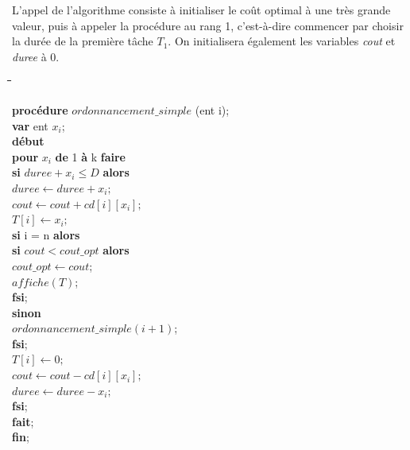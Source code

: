 \documentclass[a4paper, titlepage]{article}
\begin{document}
			L'appel de l'algorithme consiste à initialiser le coût optimal à une très grande valeur, puis à appeler la procédure au rang 1, c'est-à-dire commencer par choisir la durée de la première tâche $T_{1}$.
			On initialisera également les variables \emph{cout} et \emph{duree} à 0.

			\begin{tabbing}

			\hspace{1cm}\=\hspace{1cm}\=\hspace{1cm}\=\hspace{1cm}\=\hspace{1cm}\=\kill %

			\textbf{procédure} $ordonnancement\_simple$ (ent i); \\
			\textbf{var} ent $x_{i}$; \\
			\textbf{début} \\
			\> \textbf{pour} $x_{i}$ \textbf{de} 1 \textbf{à} k \textbf{faire} \\
			\>\> \textbf{si} $duree+x_{i}\le D$ \textbf{alors} \\
			\>\>\> $duree \leftarrow duree + x_{i};$ \\
			\>\>\> $cout \leftarrow cout + cd[i][x_{i}];$ \\
			\>\>\> $T[i] \leftarrow x_{i};$ \\

			\>\>\> \textbf{si} i = n \textbf{alors} \\
			\>\>\>\> \textbf{si} $cout < cout\_opt$ \textbf{alors} \\
			\>\>\>\>\> $cout\_opt \leftarrow cout$; \\
			\>\>\>\>\> $affiche(T)$; \\
			\>\>\>\> \textbf{fsi}; \\

			\>\>\> \textbf{sinon} \\
			\>\>\>\> $ordonnancement\_simple(i+1)$; \\
			\>\>\> \textbf{fsi}; \\

			\>\>\> $T[i] \leftarrow 0;$ \\
			\>\>\> $cout \leftarrow cout - cd[i][x_{i}];$ \\
			\>\>\> $duree \leftarrow duree - x_{i};	$ \\
			\>\> \textbf{fsi}; \\
			\> \textbf{fait}; \\
			\textbf{fin};

			\end{tabbing}
\end{document}
